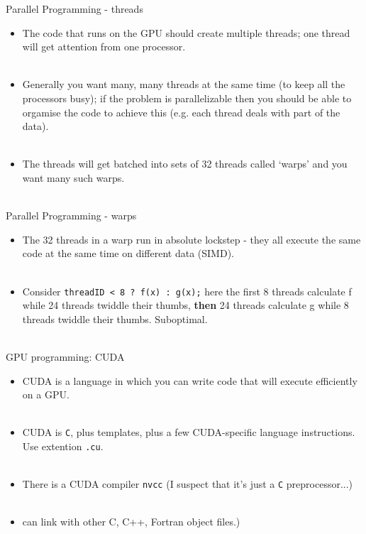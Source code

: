 \documentclass[usenames,dvipsnames]{beamer}
\begin{document}
\begin{frame}{Parallel Programming - threads}
  \begin{block}{}
    \begin{itemize}
      \item{The code that runs on the GPU should create multiple threads; one thread will get attention from one processor.}\\~\
      \item{Generally you want many, many threads at the same time (to keep all the processors busy); if the problem is parallelizable then you should be able to orgamise the code to achieve this (e.g. each thread deals with part of the data).}\\~\
      \item{The threads will get batched into sets of 32 threads called `warps' and you want many such warps.}\\~\
    \end{itemize}
  \end{block}
\end{frame}

\begin{frame}{Parallel Programming - warps}
  \begin{block}{}
    \begin{itemize}
      \item{The 32 threads in a warp run in absolute lockstep - they all execute the same code at the same time on different data (SIMD).}\\~\
      \item{Consider \texttt{threadID < 8 ? f(x) : g(x);} here the first 8 threads calculate f while 24 threads twiddle their thumbs, \textbf{then} 24 threads calculate g while 8 threads twiddle their thumbs. Suboptimal.}\\~\
    \end{itemize}
  \end{block}
\end{frame}

\begin{frame}{GPU programming: CUDA}
  \begin{block}{}
    \begin{itemize}
      \item{CUDA is a language in which you can write code that will execute efficiently on a GPU.}\\~\
      \item{CUDA is \texttt{C}, plus templates, plus a few CUDA-specific language instructions. Use extention \texttt{.cu}.}\\~\
      \item{There is a CUDA compiler \texttt{nvcc} (I suspect that it's just a \texttt{C} preprocessor...)}\\~\
      \item{can link with other C, C++, Fortran object files.)}\\~\
    \end{itemize}
  \end{block}
\end{frame}
\end{document}
